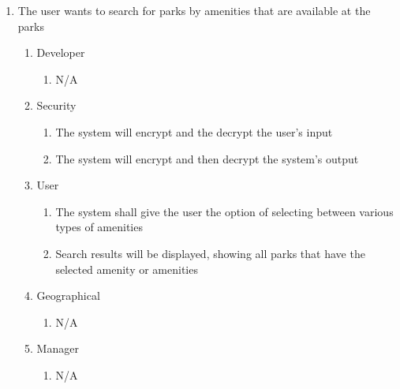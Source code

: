 \documentclass[titlepage]{article}
\begin{document}
\begin{enumerate}[{BE}1.]
	\item The user wants to search for parks by amenities that are available at the parks
    \begin{enumerate}[{VP\theenumi}.1]
        \item Developer
            \begin{enumerate}
                \item N/A
            \end{enumerate}
        \item Security
            \begin{enumerate}
                \item The system will encrypt and the decrypt the user's input
                \item The system will encrypt and then decrypt the system's output
            \end{enumerate}
        \item User
            \begin{enumerate}
                \item The system shall give the user the option of selecting between various types
                of amenities
                \item Search results will be displayed, showing all parks that have the selected
                amenity or amenities
            \end{enumerate}
        \item Geographical
            \begin{enumerate}
                \item N/A
            \end{enumerate}
        \item Manager
            \begin{enumerate}
                \item N/A
            \end{enumerate}
    \end{enumerate}


\end{enumerate}
\end{document}
